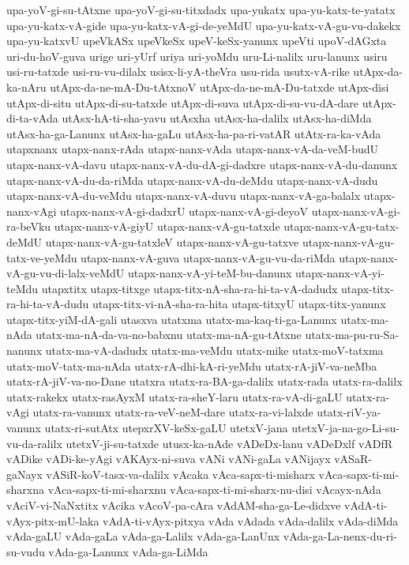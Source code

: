 {upa-yoV-gi-su-tAtxne
upa-yoV-gi-su-titxdadx
upa-yukatx
upa-yu-katx-te-yatatx
upa-yu-katx-vA-gide
upa-yu-katx-vA-gi-de-yeMdU
upa-yu-katx-vA-gu-vu-dakekx
upa-yu-katxvU
upeVkASx
upeVkeSx
upeV-keSx-yanunx
upeVti
upoV-dAGxta
uri-du-hoV-guva
urige
uri-yUrf
uriya
uri-yoMdu
uru-Li-nalilx
uru-lanunx
usiru
usi-ru-tatxde
usi-ru-vu-dilalx
usisx-li-yA-theVra
usu-rida
usutx-vA-rike
utApx-da-ka-nAru
utApx-da-ne-mA-Du-tAtxnoV
utApx-da-ne-mA-Du-tatxde
utApx-disi
utApx-di-situ
utApx-di-su-tatxde
utApx-di-suva
utApx-di-su-vu-dA-dare
utApx-di-ta-vAda
utAsx-hA-ti-sha-yavu
utAsxha
utAsx-ha-dalilx
utAsx-ha-diMda
utAsx-ha-ga-Lanunx
utAsx-ha-gaLu
utAsx-ha-pa-ri-vatAR
utAtx-ra-ka-vAda
utapxnanx
utapx-nanx-rAda
utapx-nanx-vAda
utapx-nanx-vA-da-veM-budU
utapx-nanx-vA-davu
utapx-nanx-vA-du-dA-gi-dadxre
utapx-nanx-vA-du-danunx
utapx-nanx-vA-du-da-riMda
utapx-nanx-vA-du-deMdu
utapx-nanx-vA-dudu
utapx-nanx-vA-du-veMdu
utapx-nanx-vA-duvu
utapx-nanx-vA-ga-balalx
utapx-nanx-vAgi
utapx-nanx-vA-gi-dadxrU
utapx-nanx-vA-gi-deyoV
utapx-nanx-vA-gi-ra-beVku
utapx-nanx-vA-giyU
utapx-nanx-vA-gu-tatxde
utapx-nanx-vA-gu-tatx-deMdU
utapx-nanx-vA-gu-tatxleV
utapx-nanx-vA-gu-tatxve
utapx-nanx-vA-gu-tatx-ve-yeMdu
utapx-nanx-vA-guva
utapx-nanx-vA-gu-vu-da-riMda
utapx-nanx-vA-gu-vu-di-lalx-veMdU
utapx-nanx-vA-yi-teM-bu-danunx
utapx-nanx-vA-yi-teMdu
utapxtitx
utapx-titxge
utapx-titx-nA-sha-ra-hi-ta-vA-dadudx
utapx-titx-ra-hi-ta-vA-dudu
utapx-titx-vi-nA-sha-ra-hita
utapx-titxyU
utapx-titx-yanunx
utapx-titx-yiM-dA-gali
utasxva
utatxma
utatx-ma-kaq-ti-ga-Lanunx
utatx-ma-nAda
utatx-ma-nA-da-va-no-babxnu
utatx-ma-nA-gu-tAtxne
utatx-ma-pu-ru-Sa-nanunx
utatx-ma-vA-dadudx
utatx-ma-veMdu
utatx-mike
utatx-moV-tatxma
utatx-moV-tatx-ma-nAda
utatx-rA-dhi-kA-ri-yeMdu
utatx-rA-jiV-va-neMba
utatx-rA-jiV-va-no-Dane
utatxra
utatx-ra-BA-ga-dalilx
utatx-rada
utatx-ra-dalilx
utatx-rakekx
utatx-rasAyxM
utatx-ra-sheY-laru
utatx-ra-vA-di-gaLU
utatx-ra-vAgi
utatx-ra-vanunx
utatx-ra-veV-neM-dare
utatx-ra-vi-lalxde
utatx-riV-ya-vanunx
utatx-ri-sutAtx
utepxrXV-keSx-gaLU
utetxV-jana
utetxV-ja-na-go-Li-su-vu-da-ralilx
utetxV-ji-su-tatxde
utusx-ka-nAde
vADeDx-lanu
vADeDxlf
vADfR
vADike
vADi-ke-yAgi
vAKAyx-ni-suva
vANi
vANi-gaLa
vANijayx
vASaR-gaNayx
vASiR-koV-tasx-va-dalilx
vAcaka
vAca-sapx-ti-misharx
vAca-sapx-ti-mi-sharxna
vAca-sapx-ti-mi-sharxnu
vAca-sapx-ti-mi-sharx-nu-disi
vAcayx-nAda
vAciV-vi-NaNxtitx
vAcika
vAcoV-pa-cAra
vAdAM-sha-ga-Le-didxve
vAdA-ti-vAyx-pitx-mU-laka
vAdA-ti-vAyx-pitxya
vAda
vAdada
vAda-dalilx
vAda-diMda
vAda-gaLU
vAda-gaLa
vAda-ga-Lalilx
vAda-ga-LanUnx
vAda-ga-La-nenx-du-ri-su-vudu
vAda-ga-Lanunx
vAda-ga-LiMda
}
